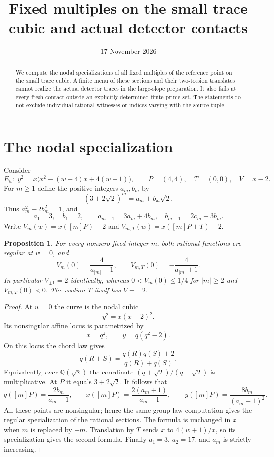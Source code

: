 \documentclass[11pt,a4paper]{article}
\title{Fixed multiples on the small trace cubic and actual detector contacts}
\author{}\date{17 November 2026}
\newtheorem{proposition}{Proposition}
\newcommand{\Q}{\mathbb Q}\newcommand{\Z}{\mathbb Z}
\begin{document}
\maketitle
\begin{abstract}
We compute the nodal specializations of all fixed multiples of the
reference point on the small trace cubic. A finite menu of these
sections and their two-torsion translates cannot realize the actual
detector traces in the large-slope preparation. It also fails at every
fresh contact outside an explicitly determined finite prime set.
The statements do not exclude individual rational witnesses or
indices varying with the source tuple.
\end{abstract}

\section{The nodal specialization}
Consider
\[
 E_w:\ y^2=x\bigl(x^2-(w+4)x+4(w+1)\bigr),\qquad
 P=(4,4),\quad T=(0,0),\quad V=x-2.
\]
For $m\ge1$ define the positive integers $a_m,b_m$ by
\[
 (3+2\sqrt2)^m=a_m+b_m\sqrt2.
\]
Thus $a_m^2-2b_m^2=1$, and
\[
 a_1=3,\quad b_1=2,\qquad
 a_{m+1}=3a_m+4b_m,\quad b_{m+1}=2a_m+3b_m.
\]
Write $V_m(w)=x([m]P)-2$ and
$V_{m,T}(w)=x([m]P+T)-2$.

\begin{proposition}\label{prop:limits}
For every nonzero fixed integer $m$, both rational functions are
regular at $w=0$, and
\[
 V_m(0)=\frac4{a_{|m|}-1},\qquad
 V_{m,T}(0)=-\frac4{a_{|m|}+1}.
\]
In particular $V_{\pm1}=2$ identically, whereas
$0<V_m(0)\le1/4$ for $|m|\ge2$ and $V_{m,T}(0)<0$.
The section $T$ itself has $V=-2$.
\end{proposition}
\begin{proof}
At $w=0$ the curve is the nodal cubic
\[
                         y^2=x(x-2)^2.
\]
Its nonsingular affine locus is parametrized by
\[
 x=q^2,\qquad y=q(q^2-2).
\]
On this locus the chord law gives
\[
 q(R+S)=\frac{q(R)q(S)+2}{q(R)+q(S)}.
\]
Equivalently, over $\Q(\sqrt2)$ the coordinate
$(q+\sqrt2)/(q-\sqrt2)$ is multiplicative. At $P$ it equals
$3+2\sqrt2$. It follows that
\[
 q([m]P)=\frac{2b_m}{a_m-1},\qquad
 x([m]P)=\frac{2(a_m+1)}{a_m-1},\qquad
 y([m]P)=\frac{8b_m}{(a_m-1)^2}.
\]
All these points are nonsingular; hence the same group-law
computation gives the regular specialization of the rational
sections. The formula is unchanged in $x$ when $m$ is replaced by
$-m$. Translation by $T$ sends $x$ to $4(w+1)/x$, so its
specialization gives the second formula. Finally $a_1=3$,
$a_2=17$, and $a_m$ is strictly increasing.
\end{proof}
\end{document}

